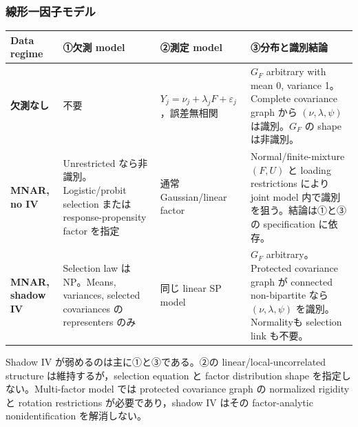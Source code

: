 \documentclass[11pt,a4paper]{ltjsarticle}
\theoremstyle{remark}
\begin{document}
\subsubsection{線形一因子モデル}
\begin{center}
\footnotesize
\begin{tabularx}{0.99\textwidth}{>{\bfseries}p{33mm}p{34mm}p{34mm}X}
\toprule
Data regime & ①欠測 model & ②測定 model & ③分布と識別結論\\
\midrule
欠測なし
& 不要
& $Y_j=\nu_j+\lambda_jF+\varepsilon_j$，誤差無相関
& $G_F$ arbitrary with mean 0, variance 1。Complete covariance graph から $(\nu,\lambda,\psi)$ は識別。$G_F$ の shape は非識別。\\
\addlinespace
MNAR, no IV
& Unrestricted なら非識別。Logistic/probit selection または response-propensity factor を指定
& 通常 Gaussian/linear factor
& Normal/finite-mixture $(F,U)$ と loading restrictions により joint model 内で識別を狙う。結論は①と③の specification に依存。\\
\addlinespace
MNAR, shadow IV
& Selection law は NP。Means, variances, selected covariances の representers のみ
& 同じ linear SP model
& $G_F$ arbitrary。Protected covariance graph が connected non-bipartite なら $(\nu,\lambda,\psi)$ を識別。Normalityも selection link も不要。\\
\bottomrule
\end{tabularx}
\end{center}

Shadow IV が弱めるのは主に①と③である。②の linear/local-uncorrelated structure は維持するが，selection equation と factor distribution shape を指定しない。Multi-factor model では protected covariance graph の normalized rigidity と rotation restrictions が必要であり，shadow IV はその factor-analytic nonidentification を解消しない。
\end{document}
